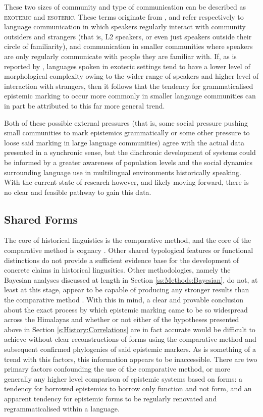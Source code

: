 These two sizes of community and type of communication can be described as \textsc{exoteric} and \textsc{esoteric}. These terms originate from , and refer respectively to language communication in which speakers regularly interact with community outsiders and strangers (that is, L2 speakers, or even just speakers outside their circle of familiarity), and communication in smaller communities where speakers are only regularly communicate with people they are familiar with. If, as is reported by , languages spoken in exoteric settings tend to have a lower level of morphological complexity owing to the wider range of speakers and higher level of interaction with strangers, then it follows that the tendency for grammaticalised epistemic marking to occur more commonly in smaller langauge communities can in part be attributed to this far more general trend. 

Both of these possible external pressures (that is, some social pressure pushing small communities to mark epistemics grammatically or some other pressure to loose said marking in large language communities) agree with the actual data presented in a synchronic sense, but the diachronic development of systems could be informed by a greater awareness of population levels and the social dynamics surrounding language use in multilingual environments historically speaking. With the current state of research however, and likely moving forward, there is no clear and feasible pathway to gain this data.
\subsection{Shared Forms}\label{ss:History:SharedForms}
The core of historical linguistics is the comparative method, and the core of the comparative method is cognacy \cite{Hyslop2020Millet}. Other shared typological features or functional distinctions do not provide a sufficient evidence base for the development of concrete claims in historical lingusitics. Other methodologies, namely the Bayesian analyses discussed at length in Section \ref{ss:Methods:Bayesian}, do not, at least at this stage, appear to be capable of producing any stronger results than the comparative method \cite{Dolin2022}. With this in mind, a clear and provable conclusion about the exact process by which epistemic marking came to be so widespread across the Himalayas and whether or not either of the hypotheses presented above in Section \ref{s:History:Correlations} are in fact accurate would be difficult to achieve without clear reconstructions of forms using the comparative method and subsequent confirmed phylogenies of said epistemic markers. As is something of a trend with this factors, this information appears to be inaccessible. There are two primary factors confounding the use of the comparative method, or more generally any higher level comparison of epistemic systems based on forms: a tendency for borrowed epistemics to borrow only function and not form, and an apparent tendency for epistemic forms to be regularly renovated and regrammaticalised within a language. 

